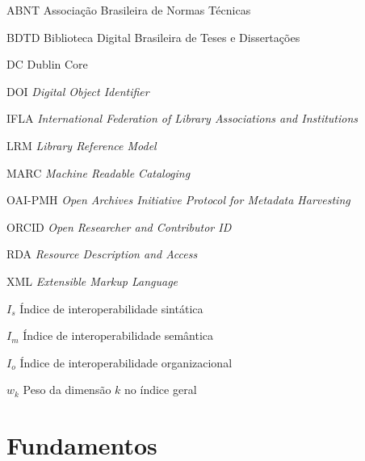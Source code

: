\documentclass[
  12pt,
  twoside,          %
  openright,
  a4paper,
  chapter=TITLE,    %
  section=TITLE,    %
  english,
  french,
  brazil            %
]{abntex2}
\begin{document}
\begin{siglas}
  \item[ABNT] Associação Brasileira de Normas Técnicas
  \item[BDTD] Biblioteca Digital Brasileira de Teses e Dissertações
  \item[DC] Dublin Core
  \item[DOI] \textit{Digital Object Identifier}
  \item[IFLA] \textit{International Federation of Library Associations and Institutions}
  \item[LRM] \textit{Library Reference Model}
  \item[MARC] \textit{Machine Readable Cataloging}
  \item[OAI-PMH] \textit{Open Archives Initiative Protocol for Metadata Harvesting}
  \item[ORCID] \textit{Open Researcher and Contributor ID}
  \item[RDA] \textit{Resource Description and Access}
  \item[XML] \textit{Extensible Markup Language}
\end{siglas}

\begin{simbolos}
  \item[$I_s$] Índice de interoperabilidade sintática
  \item[$I_m$] Índice de interoperabilidade semântica
  \item[$I_o$] Índice de interoperabilidade organizacional
  \item[$w_k$] Peso da dimensão $k$ no índice geral
\end{simbolos}

\tableofcontents*
\cleardoublepage

\textual


\part{Fundamentos}\label{part:fundamentos}


\end{document}
